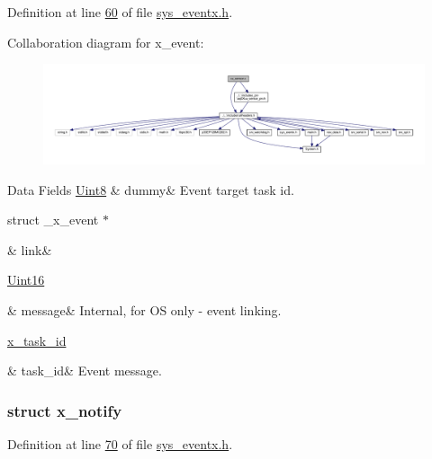 Definition at line \hyperlink{a00036_source_l00060}{60} of file \hyperlink{a00036_source}{sys\+\_\+eventx.\+h}.



Collaboration diagram for x\+\_\+event\+:\nopagebreak
\begin{figure}[H]
\begin{center}
\leavevmode
\includegraphics[width=350pt]{db/dbe/a01706}
\end{center}
\end{figure}
\begin{DoxyFields}{Data Fields}
\hypertarget{a00036_aee23fa6903f65a36a1f1727012b9ecfa}{\hyperlink{a00072_af84840501dec18061d18a68c162a8fa2}{Uint8}}\label{a00036_aee23fa6903f65a36a1f1727012b9ecfa}
&
dummy&
Event target task id. \\
\hline

\hypertarget{a00036_aab03e4ec45a7b861ab6ed51f64f58fda}{struct \+\_\+x\+\_\+event $\ast$}\label{a00036_aab03e4ec45a7b861ab6ed51f64f58fda}
&
link&
\\
\hline

\hypertarget{a00036_adf9665938515a20c283eea2c978cf80d}{\hyperlink{a00072_a59a9f6be4562c327cbfb4f7e8e18f08b}{Uint16}}\label{a00036_adf9665938515a20c283eea2c978cf80d}
&
message&
Internal, for O\+S only -\/ event linking. \\
\hline

\hypertarget{a00036_a21b41e494a28583d4da10f1afb1c5328}{\hyperlink{a00036_ad5c3c5fbfd3e4aadf22830395484a71d}{x\+\_\+task\+\_\+id}}\label{a00036_a21b41e494a28583d4da10f1afb1c5328}
&
task\+\_\+id&
Event message. \\
\hline

\end{DoxyFields}
\label{df/d4c/a00851}
\hypertarget{a00036_df/d4c/a00851}{}
\subsubsection{struct x\+\_\+notify}


Definition at line \hyperlink{a00036_source_l00070}{70} of file \hyperlink{a00036_source}{sys\+\_\+eventx.\+h}.



